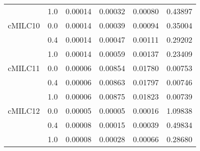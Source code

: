 \begin{longtable}{cccccc}
     & 1.0 & 0.00014 & 0.00032 & 0.00080 & 0.43897 \\
cMILC10 & 0.0 & 0.00014 & 0.00039 & 0.00094 & 0.35004 \\
     & 0.4 & 0.00014 & 0.00047 & 0.00111 & 0.29202 \\
     & 1.0 & 0.00014 & 0.00059 & 0.00137 & 0.23409 \\
cMILC11 & 0.0 & 0.00006 & 0.00854 & 0.01780 & 0.00753 \\
     & 0.4 & 0.00006 & 0.00863 & 0.01797 & 0.00746 \\
     & 1.0 & 0.00006 & 0.00875 & 0.01823 & 0.00739 \\
cMILC12 & 0.0 & 0.00005 & 0.00005 & 0.00016 & 1.09838 \\
     & 0.4 & 0.00008 & 0.00015 & 0.00039 & 0.49834 \\
     & 1.0 & 0.00008 & 0.00028 & 0.00066 & 0.28680 \\
\end{longtable}
